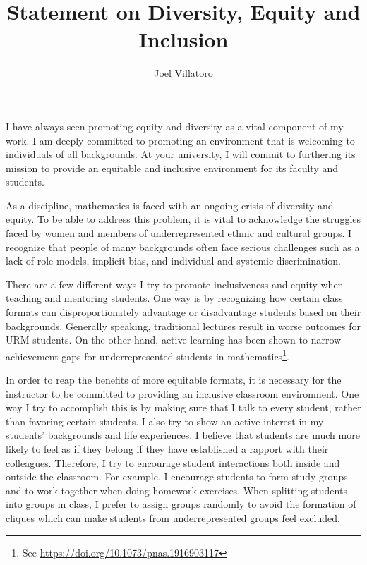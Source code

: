 \documentclass{article}
\title{Statement on Diversity, Equity and Inclusion}
\author{Joel Villatoro}
\date{}
\begin{document}
\vspace{-0.5in}
\maketitle

I have always seen promoting equity and diversity as a vital component of my work. I am deeply committed to promoting an environment that is welcoming to individuals of all backgrounds. At your university, I will commit to furthering its mission to provide an equitable and inclusive environment for its faculty and students.

As a discipline, mathematics is faced with an ongoing crisis of diversity and equity. To be able to address this problem, it is vital to acknowledge the struggles faced by women and members of underrepresented ethnic and cultural groups. I recognize that people of many backgrounds often face serious challenges such as a lack of role models, implicit bias, and individual and systemic discrimination. 

There are a few different ways I try to promote inclusiveness and equity when teaching and mentoring students. One way is by recognizing how certain class formats can disproportionately advantage or disadvantage students based on their backgrounds. Generally speaking, traditional lectures result in worse outcomes for URM students. On the other hand, active learning has been shown to narrow achievement gaps for underrepresented students in mathematics\footnote{See \url{https://doi.org/10.1073/pnas.1916903117}}. 

In order to reap the benefits of more equitable formats, it is necessary for the instructor to be committed to providing an inclusive classroom environment. One way I try to accomplish this is by making sure that I talk to every student, rather than favoring certain students. I also try to show an active interest in my students' backgrounds and life experiences. I believe that students are much more likely to feel as if they belong if they have established a rapport with their colleagues. Therefore, I try to encourage student interactions both inside and outside the classroom. For example, I encourage students to form study groups and to work together when doing homework exercises. When splitting students into groups in class, I prefer to assign groups randomly to avoid the formation of cliques which can make students from underrepresented groups feel excluded.
\end{document}
